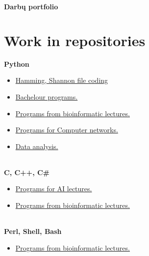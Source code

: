 \documentclass[a4paper,12pt]{article}
\begin{document}
\graphicspath{ {/} }

\renewcommand{\cftdot}{.}	
\renewcommand{\cftsecleader}{\cftdotfill{\cftdotsep}}

\thispagestyle{empty} %


\begin{center}
\textbf{Darbų portfolio} \\
\end{center}
\vspace{0.5cm}
\normalsize
\section{Work in repositories}

\textbf{Python}
\begin{itemize}
	\item \href{https://github.com/Luksys5/LT_programos/tree/code}{Hamming, Shannon file coding}
	\item 
\href{https://github.com/Luksys5/LT_programos/tree/Bakalaurinis}{Bachelour programs.}
	\item 
\href{https://github.com/Luksys5/LT_programos/tree/Biotrees}{Programs from bioinformatic lectures.}
	\item 
\href{https://github.com/Luksys5/LT_programos/tree/tinklai}{Programs for Computer networks.}
	\item 
\href{https://github.com/Luksys5/LT_programos/tree/Duomenu_Tyrimas}{Data analysis.} \\\\
\end{itemize}

\textbf{C, C++, C\#}
\begin{itemize}
	\item 
\href{https://github.com/Luksys5/LT_programos/tree/Dirbtini_Iq}{Programs for AI lectures.}
	\item 
\href{https://github.com/Luksys5/LT_programos/tree/Bioinformatika_4k}{Programs from bioinformatic lectures.} \\\\
\end{itemize}

\textbf{Perl, Shell, Bash}
\begin{itemize}
	\item 
\href{https://github.com/Luksys5/LT_programos/tree/GNU-PERL}{Programs from bioinformatic lectures.}\\\\ 
\end{itemize} 
\end{document}
